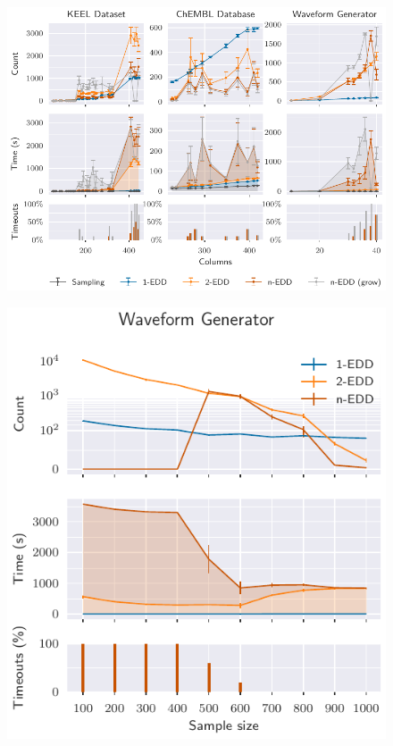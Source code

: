 \documentclass[10pt,notes]{beamer}
\begin{document}
\begin{frame}{}
\begin{figure}
    \centering
    \includegraphics[width=\textwidth]{scalability.pdf}
\end{figure}
\end{frame}

\begin{frame}{}
\begin{figure}
    \centering
    \includegraphics[height=\textheight]{scalability_sample_wave.pdf}
\end{figure}
\end{frame}
\end{document}
